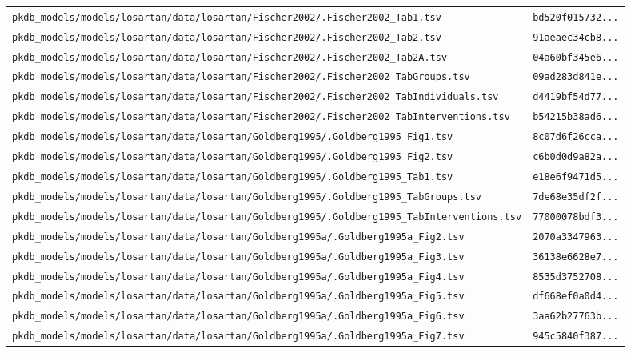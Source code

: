 \begin{longtable}{ll}
\texttt{pkdb\_models/models/losartan/data/losartan/Fischer2002/.Fischer2002\_Tab1.tsv} & \texttt{bd520f015732...} \\
\texttt{pkdb\_models/models/losartan/data/losartan/Fischer2002/.Fischer2002\_Tab2.tsv} & \texttt{91aeaec34cb8...} \\
\texttt{pkdb\_models/models/losartan/data/losartan/Fischer2002/.Fischer2002\_Tab2A.tsv} & \texttt{04a60bf345e6...} \\
\texttt{pkdb\_models/models/losartan/data/losartan/Fischer2002/.Fischer2002\_TabGroups.tsv} & \texttt{09ad283d841e...} \\
\texttt{pkdb\_models/models/losartan/data/losartan/Fischer2002/.Fischer2002\_TabIndividuals.tsv} & \texttt{d4419bf54d77...} \\
\texttt{pkdb\_models/models/losartan/data/losartan/Fischer2002/.Fischer2002\_TabInterventions.tsv} & \texttt{b54215b38ad6...} \\
\texttt{pkdb\_models/models/losartan/data/losartan/Goldberg1995/.Goldberg1995\_Fig1.tsv} & \texttt{8c07d6f26cca...} \\
\texttt{pkdb\_models/models/losartan/data/losartan/Goldberg1995/.Goldberg1995\_Fig2.tsv} & \texttt{c6b0d0d9a82a...} \\
\texttt{pkdb\_models/models/losartan/data/losartan/Goldberg1995/.Goldberg1995\_Tab1.tsv} & \texttt{e18e6f9471d5...} \\
\texttt{pkdb\_models/models/losartan/data/losartan/Goldberg1995/.Goldberg1995\_TabGroups.tsv} & \texttt{7de68e35df2f...} \\
\texttt{pkdb\_models/models/losartan/data/losartan/Goldberg1995/.Goldberg1995\_TabInterventions.tsv} & \texttt{77000078bdf3...} \\
\texttt{pkdb\_models/models/losartan/data/losartan/Goldberg1995a/.Goldberg1995a\_Fig2.tsv} & \texttt{2070a3347963...} \\
\texttt{pkdb\_models/models/losartan/data/losartan/Goldberg1995a/.Goldberg1995a\_Fig3.tsv} & \texttt{36138e6628e7...} \\
\texttt{pkdb\_models/models/losartan/data/losartan/Goldberg1995a/.Goldberg1995a\_Fig4.tsv} & \texttt{8535d3752708...} \\
\texttt{pkdb\_models/models/losartan/data/losartan/Goldberg1995a/.Goldberg1995a\_Fig5.tsv} & \texttt{df668ef0a0d4...} \\
\texttt{pkdb\_models/models/losartan/data/losartan/Goldberg1995a/.Goldberg1995a\_Fig6.tsv} & \texttt{3aa62b27763b...} \\
\texttt{pkdb\_models/models/losartan/data/losartan/Goldberg1995a/.Goldberg1995a\_Fig7.tsv} & \texttt{945c5840f387...} \\

\end{longtable}
